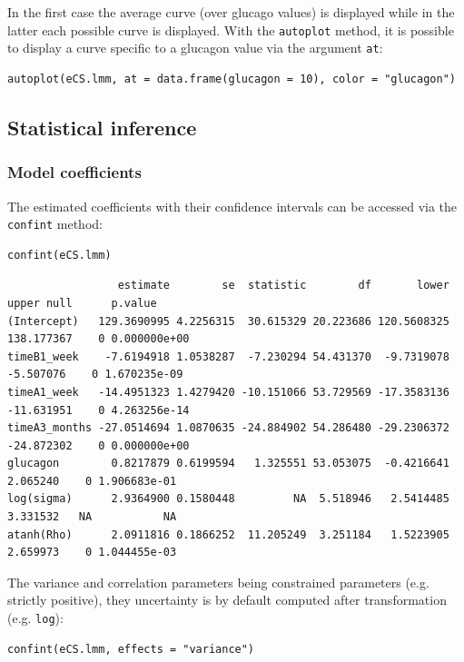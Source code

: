 \documentclass[12pt]{article}
\begin{document}
In the first case the average curve (over glucago values) is displayed
while in the latter each possible curve is displayed. With the
\texttt{autoplot} method, it is possible to display a curve specific to a
glucagon value via the argument \texttt{at}:
\lstset{language=r,label= ,caption= ,captionpos=b,numbers=none}
\begin{lstlisting}
autoplot(eCS.lmm, at = data.frame(glucagon = 10), color = "glucagon")
\end{lstlisting}

\subsection{Statistical inference}
\label{sec:org231266b}

\subsubsection{Model coefficients}
\label{sec:org697ab96}

The estimated coefficients with their confidence intervals can be accessed via the \texttt{confint} method:
\lstset{language=r,label= ,caption= ,captionpos=b,numbers=none}
\begin{lstlisting}
confint(eCS.lmm)
\end{lstlisting}

\begin{verbatim}
                 estimate        se  statistic        df       lower      upper null      p.value
(Intercept)   129.3690995 4.2256315  30.615329 20.223686 120.5608325 138.177367    0 0.000000e+00
timeB1_week    -7.6194918 1.0538287  -7.230294 54.431370  -9.7319078  -5.507076    0 1.670235e-09
timeA1_week   -14.4951323 1.4279420 -10.151066 53.729569 -17.3583136 -11.631951    0 4.263256e-14
timeA3_months -27.0514694 1.0870635 -24.884902 54.286480 -29.2306372 -24.872302    0 0.000000e+00
glucagon        0.8217879 0.6199594   1.325551 53.053075  -0.4216641   2.065240    0 1.906683e-01
log(sigma)      2.9364900 0.1580448         NA  5.518946   2.5414485   3.331532   NA           NA
atanh(Rho)      2.0911816 0.1866252  11.205249  3.251184   1.5223905   2.659973    0 1.044455e-03
\end{verbatim}


The variance and correlation parameters being constrained parameters
(e.g. strictly positive), they uncertainty is by default computed
after transformation (e.g. \texttt{log}):
\lstset{language=r,label= ,caption= ,captionpos=b,numbers=none}
\begin{lstlisting}
confint(eCS.lmm, effects = "variance")
\end{lstlisting}
\end{document}

